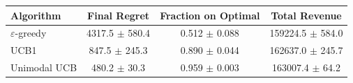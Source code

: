 \begin{tabular}{lccc}
\hline
Algorithm & Final Regret & Fraction on Optimal & Total Revenue \\
\hline
$\varepsilon$-greedy & 4317.5 $\pm$ 580.4 & 0.512 $\pm$ 0.088 & 159224.5 $\pm$ 584.0 \\
UCB1 & 847.5 $\pm$ 245.3 & 0.890 $\pm$ 0.044 & 162637.0 $\pm$ 245.7 \\
Unimodal UCB & 480.2 $\pm$ 30.3 & 0.959 $\pm$ 0.003 & 163007.4 $\pm$ 64.2 \\
\hline
\end{tabular}
